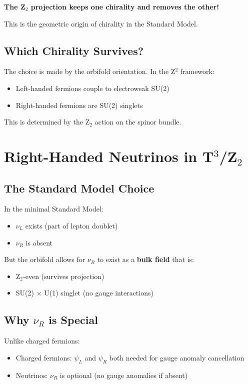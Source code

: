 \documentclass[12pt,a4paper]{article}
\begin{document}
\textbf{The Z$_2$ projection keeps one chirality and removes the other!}

This is the geometric origin of chirality in the Standard Model.

\subsection{Which Chirality Survives?}

The choice is made by the orbifold orientation. In the Z$^2$ framework:
\begin{itemize}
\item Left-handed fermions couple to electroweak SU(2)
\item Right-handed fermions are SU(2) singlets
\end{itemize}

This is determined by the Z$_2$ action on the spinor bundle.

\section{Right-Handed Neutrinos in T$^3$/Z$_2$}

\subsection{The Standard Model Choice}

In the minimal Standard Model:
\begin{itemize}
\item $\nu_L$ exists (part of lepton doublet)
\item $\nu_R$ is absent
\end{itemize}

But the orbifold allows for $\nu_R$ to exist as a \textbf{bulk field} that is:
\begin{itemize}
\item Z$_2$-even (survives projection)
\item SU(2) $\times$ U(1) singlet (no gauge interactions)
\end{itemize}

\subsection{Why $\nu_R$ is Special}

Unlike charged fermions:
\begin{itemize}
\item Charged fermions: $\psi_L$ and $\psi_R$ both needed for gauge anomaly cancellation
\item Neutrinos: $\nu_R$ is optional (no gauge anomalies if absent)
\end{itemize}
\end{document}
